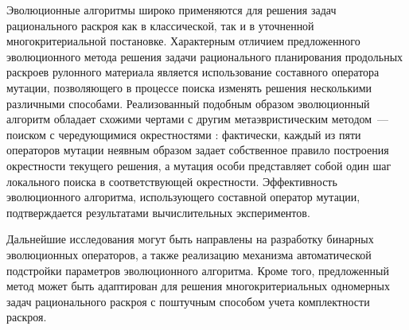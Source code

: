 \documentclass[12pt]{article}
\begin{document}
Эволюционные алгоритмы широко применяются для решения задач рационального 
раскроя как в классической, так и в уточненной многокритериальной постановке. 
Характерным отличием предложенного эволюционного метода решения задачи 
рационального планирования продольных раскроев рулонного материала является 
использование составного оператора мутации, позволяющего в процессе поиска 
изменять решения несколькими различными способами. Реализованный подобным 
образом эволюционный алгоритм обладает схожими чертами с другим 
метаэвристическим методом~--- поиском с чередующимися окрестностями 
\cite{bib:mladenovic97}: 
фактически, каждый из пяти операторов мутации неявным образом задает 
собственное правило построения окрестности текущего решения, а мутация особи 
представляет собой один шаг локального поиска в соответствующей окрестности. 
Эффективность эволюционного алгоритма, использующего составной оператор 
мутации, подтверждается результатами вычислительных экспериментов.

Дальнейшие исследования могут быть направлены на разработку бинарных 
эволюционных операторов, а также реализацию механизма автоматической 
подстройки параметров эволюционного алгоритма. Кроме того, предложенный метод 
может быть адаптирован для решения многокритериальных одномерных задач 
рационального раскроя с поштучным способом учета комплектности раскроя.
\end{document}
